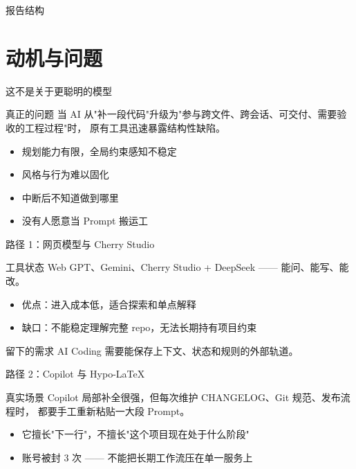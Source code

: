 \documentclass[theme=workflow,aspectratio=169,fontset=tech]{Hypo-Slide}
\author[Project Draft]{Hypo-Workflow Project Draft}
\begin{document}
\begin{frame}[plain]
  \titlepage
\end{frame}

\begin{frame}{报告结构}
  \tableofcontents
\end{frame}


\section{动机与问题}

\begin{frame}{这不是关于更聪明的模型}
  \begin{block}{真正的问题}
    当 AI 从"补一段代码"升级为"参与跨文件、跨会话、可交付、需要验收的工程过程"时，
    原有工具迅速暴露结构性缺陷。
  \end{block}

  \begin{itemize}
    \item 规划能力有限，全局约束感知不稳定
    \item 风格与行为难以固化
    \item 中断后不知道做到哪里
    \item 没有人愿意当 Prompt 搬运工
  \end{itemize}
\end{frame}

\begin{frame}{路径 1：网页模型与 Cherry Studio}
  \begin{block}{工具状态}
    Web GPT、Gemini、Cherry Studio + DeepSeek —— 能问、能写、能改。
  \end{block}
  \begin{itemize}
    \item 优点：进入成本低，适合探索和单点解释
    \item 缺口：不能稳定理解完整 repo，无法长期持有项目约束
  \end{itemize}
  \begin{alertblock}{留下的需求}
    AI Coding 需要能保存上下文、状态和规则的外部轨道。
  \end{alertblock}
\end{frame}

\begin{frame}{路径 2：Copilot 与 Hypo-LaTeX}
  \begin{block}{真实场景}
    Copilot 局部补全很强，但每次维护 CHANGELOG、Git 规范、发布流程时，
    都要手工重新粘贴一大段 Prompt。
  \end{block}
  \begin{itemize}
    \item 它擅长"下一行"，不擅长"这个项目现在处于什么阶段"
    \item 账号被封 3 次 —— 不能把长期工作流压在单一服务上
  \end{itemize}
\end{frame}
\end{document}
